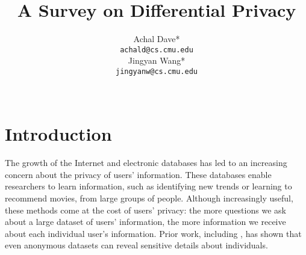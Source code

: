 \documentclass{article} %
\title{A Survey on Differential Privacy}
\author{
Achal Dave* \\
\texttt{achald@cs.cmu.edu} \\
\And
Jingyan Wang* \\
\texttt{jingyanw@cs.cmu.edu} \\
\\
}
\begin{document}
\maketitle

%
%
%
%
%
%

\section{Introduction}
The growth of the Internet and electronic databases has led to an
increasing concern about the privacy of users' information. These databases
enable researchers to learn information, such as
identifying new trends or learning to recommend movies, from large
groups of people. Although increasingly useful, these methods come at the cost
of users' privacy: the more questions we ask about a large dataset of users'
information, the more information we receive about each individual user's
information. Prior work, including \cite{narayanan2008robust,
sweeney1997weaving, ganta2008composition}, has shown that even anonymous
datasets can reveal sensitive details about individuals.
\end{document}
